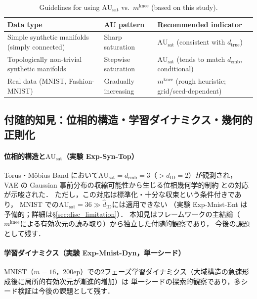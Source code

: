 \documentclass[11pt,a4paper]{jsarticle}
\newcommand{\dID}{d_{\mathrm{ID}}}
\newcommand{\dtrue}{d_{\mathrm{true}}}
\newcommand{\AUsat}{\mathrm{AU}_{\mathrm{sat}}}
\newcommand{\mknee}{m^{\mathrm{knee}}}
\newcommand{\demb}{d_{\mathrm{emb}}}
\begin{document}
\begin{table}[H]
\centering
\caption{Guidelines for using $\AUsat$ vs.\ $\mknee$ (based on this study).}
\label{tab:au_comparison}
\small
\begin{tabular}{lll}
\toprule
Data type & AU pattern & Recommended indicator \\
\midrule
Simple synthetic manifolds (simply connected) & Sharp saturation & $\AUsat$ (consistent with $\dtrue$) \\
Topologically non-trivial synthetic manifolds & Stepwise saturation & $\AUsat$ (tends to match $\demb$, conditional) \\
Real data (MNIST, Fashion-MNIST) & Gradually increasing & $\mknee$ (rough heuristic; grid/seed-dependent) \\
\bottomrule
\end{tabular}
\end{table}

\subsection{付随的知見：位相的構造・学習ダイナミクス・幾何的正則化}\label{sec:disc_incidental}

\paragraph{位相的構造と$\AUsat$（実験 Exp-Syn-Top）}
Torus・Möbius Band において$\AUsat = \demb = 3$（$> \dID = 2$）が観測され，
VAE の Gaussian 事前分布の収縮可能性から生じる位相幾何学的制約
\cite{hatcher2002algebraic,guillemin1974differential}との対応が示唆された．
ただし，この対応は標準化・十分な収束という条件付きであり，
MNIST での$\AUsat = 36 \gg \hat{d}_\mathrm{ID}$には適用できない
（実験 Exp-Mnist-Ent は予備的；詳細は§\ref{sec:disc_limitation}）．
本知見はフレームワークの主結論（$\mknee$による有効次元の読み取り）から独立した付随的観察であり，
今後の課題として残す．

\paragraph{学習ダイナミクス（実験 Exp-Mnist-Dyn，単一シード）}
MNIST（$m=16$，200ep）での2フェーズ学習ダイナミクス（大域構造の急速形成後に局所的有効次元が漸進的増加）は
単一シードの探索的観察であり，多シード検証は今後の課題として残す．
\end{document}
